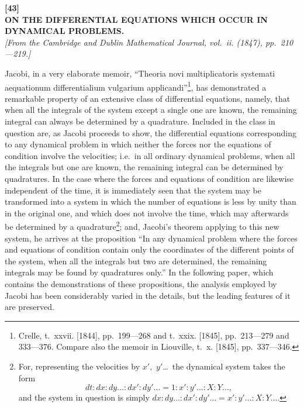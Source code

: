 \documentclass[11pt,a4paper]{book}
\begin{document}

\newpage
\begin{center}
\textbf{[43]}\\[4pt]
\textbf{\large ON THE DIFFERENTIAL EQUATIONS WHICH OCCUR IN\\DYNAMICAL PROBLEMS.}\\[4pt]
\textit{[From the Cambridge and Dublin Mathematical Journal, vol.~ii. (1847), pp.~210---219.]}
\end{center}

\vspace{6pt}

Jacobi, in a very elaborate memoir, ``Theoria novi multiplicatoris systemati aequationum differentialium vulgarium applicandi''\footnote{Crelle, t.~xxvii. [1844], pp.~199---268 and t.~xxix. [1845], pp.~213---279 and 333---376. Compare also the memoir in Liouville, t.~x. [1845], pp.~337---346.}, has demonstrated a remarkable property of an extensive class of differential equations, namely, that when all the integrals of the system except a single one are known, the remaining integral can always be determined by a quadrature. Included in the class in question are, as Jacobi proceeds to show, the differential equations corresponding to any dynamical problem in which neither the forces nor the equations of condition involve the velocities; i.e.~in all ordinary dynamical problems, when all the integrals but one are known, the remaining integral can be determined by quadratures. In the case where the forces and equations of condition are likewise independent of the time, it is immediately seen that the system may be transformed into a system in which the number of equations is less by unity than in the original one, and which does not involve the time, which may afterwards be determined by a quadrature\footnote{For, representing the velocities by $x'$,~$y'$\ldots\ the dynamical system takes the form
\[
dt : dx : dy\ldots : dx' : dy'\ldots = 1 : x' : y'\ldots : X : Y\ldots,
\]
and the system in question is simply $dx : dy\ldots : dx' : dy'\ldots = x' : y'\ldots : X : Y\ldots$.}; and, Jacobi's theorem applying to this new system, he arrives at the proposition ``In any dynamical problem where the forces and equations of condition contain only the coordinates of the different points of the system, when all the integrals but two are determined, the remaining integrals may be found by quadratures only.'' In the following paper, which contains the demonstrations of these propositions, the analysis employed by Jacobi has been considerably varied in the details, but the leading features of it are preserved.
\end{document}
